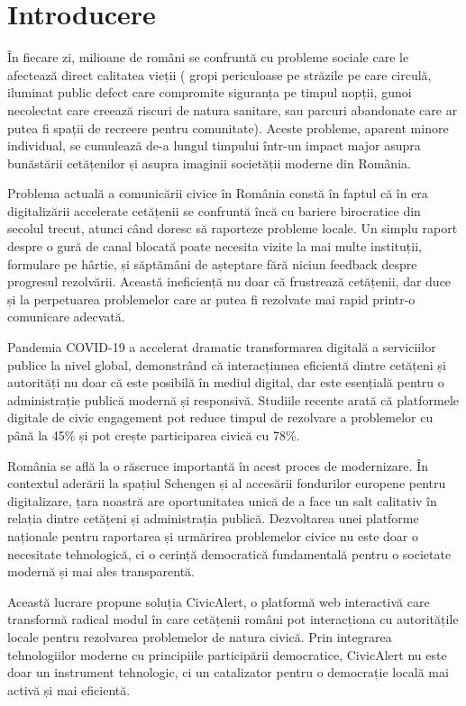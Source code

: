 \documentclass[12pt,a4paper]{report}
\begin{document}
\chapter*{Introducere}

În fiecare zi, milioane de români se confruntă cu probleme sociale care le afectează direct calitatea vieții ( gropi periculoase pe străzile pe care circulă, iluminat public defect care compromite siguranța pe timpul nopții, gunoi necolectat care creează riscuri de natura sanitare, sau parcuri abandonate care ar putea fi spații de recreere pentru comunitate). Aceste probleme, aparent minore individual, se cumulează de-a lungul timpului  într-un impact major asupra bunăstării cetățenilor și asupra imaginii societății  moderne din România.

Problema actuală a  comunicării civice în România constă în faptul că în era digitalizării accelerate cetățenii se confruntă încă cu bariere birocratice din secolul trecut, atunci când doresc să raporteze probleme locale. Un simplu raport despre o gură de canal blocată poate necesita vizite la mai multe  instituții, formulare pe hârtie, și săptămâni de așteptare fără niciun feedback despre progresul rezolvării. Această ineficiență nu doar că frustrează cetățenii, dar duce și la perpetuarea problemelor care ar putea fi rezolvate mai rapid printr-o comunicare adecvată.

Pandemia COVID-19 a accelerat dramatic transformarea digitală a serviciilor publice la nivel global, demonstrând că interacțiunea eficientă dintre cetățeni și autorități nu doar că este posibilă în mediul digital, dar este esențială pentru o administrație publică modernă și responsivă. Studiile recente arată că platformele digitale de civic engagement pot reduce timpul de rezolvare a problemelor cu până la 45\% și pot crește participarea civică cu 78\%.

România se află la o răscruce importantă în acest proces de modernizare. În contextul aderării la spațiul Schengen și al accesării fondurilor europene pentru digitalizare, țara noastră are oportunitatea unică de a face un salt calitativ în relația dintre cetățeni și administrația publică. Dezvoltarea unei platforme naționale pentru raportarea și urmărirea problemelor civice nu este doar o necesitate tehnologică, ci o cerință democratică fundamentală pentru o societate modernă și mai ales transparentă.

Această lucrare  propune soluția CivicAlert, o platformă web interactivă care transformă radical modul în care cetățenii români pot interacționa cu autoritățile locale pentru rezolvarea problemelor de natura civică. Prin integrarea tehnologiilor moderne cu principiile participării democratice, CivicAlert nu este doar un instrument tehnologic, ci un catalizator pentru o democrație locală mai activă și mai eficientă.
\end{document}
